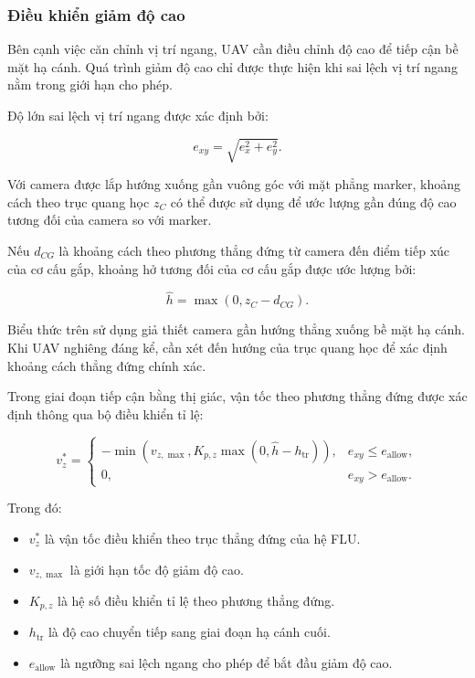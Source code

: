 \subsubsection{Điều khiển giảm độ cao}

Bên cạnh việc căn chỉnh vị trí ngang, UAV
cần điều chỉnh độ cao để tiếp cận bề mặt
hạ cánh. Quá trình giảm độ cao chỉ được
thực hiện khi sai lệch vị trí ngang nằm
trong giới hạn cho phép.

Độ lớn sai lệch vị trí ngang được xác định bởi:

\begin{equation}
e_{xy}
=
\sqrt{e_x^2+e_y^2}.
\label{eq:landing_xy_distance}
\end{equation}

Với camera được lắp hướng xuống gần vuông
góc với mặt phẳng marker, khoảng cách theo
trục quang học $z_C$ có thể được sử dụng để
ước lượng gần đúng độ cao tương đối của
camera so với marker.

Nếu $d_{CG}$ là khoảng cách theo phương
thẳng đứng từ camera đến điểm tiếp xúc
của cơ cấu gắp, khoảng hở tương đối của
cơ cấu gắp được ước lượng bởi:

\begin{equation}
\hat{h}
=
\max(0,z_C-d_{CG}).
\label{eq:gripper_clearance_estimate}
\end{equation}

Biểu thức trên sử dụng giả thiết camera
gần hướng thẳng xuống bề mặt hạ cánh.
Khi UAV nghiêng đáng kể, cần xét đến
hướng của trục quang học để xác định
khoảng cách thẳng đứng chính xác.

Trong giai đoạn tiếp cận bằng thị giác,
vận tốc theo phương thẳng đứng được xác
định thông qua bộ điều khiển tỉ lệ:

\begin{equation}
v_z^{*}
=
\begin{cases}
-\min\left(
v_{z,\max},
K_{p,z}\max(0,\hat{h}-h_{\mathrm{tr}})
\right),
& e_{xy}\leq e_{\mathrm{allow}},\\[6pt]
0,
& e_{xy}>e_{\mathrm{allow}}.
\end{cases}
\label{eq:landing_vertical_control}
\end{equation}

Trong đó:
\begin{itemize}
    \item $v_z^{*}$ là vận tốc điều khiển
    theo trục thẳng đứng của hệ FLU.
    
    \item $v_{z,\max}$ là giới hạn tốc độ
    giảm độ cao.
    
    \item $K_{p,z}$ là hệ số điều khiển
    tỉ lệ theo phương thẳng đứng.
    
    \item $h_{\mathrm{tr}}$ là độ cao
    chuyển tiếp sang giai đoạn hạ cánh cuối.
    
    \item $e_{\mathrm{allow}}$ là ngưỡng
    sai lệch ngang cho phép để bắt đầu
    giảm độ cao.
\end{itemize}

